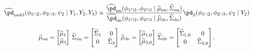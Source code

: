 \begin{equation}
\begin{gathered}
  \widehat{\pd}_{\text{meld}} (\phi_{1 \cap 2}, \phi_{2 \cap 3}, \psi_{2} \mid Y_{1}, Y_{2}, Y_{3})
  \propto
  \frac {
    \widehat{\pd}_{\text{nu}}(\phi_{1 \cap 2}, \phi_{2 \cap 3} \mid \widehat{\mu}_{\text{nu}}, \widehat{\Sigma}_{\text{nu}})
  } {
    \widehat{\pd}_{\text{de}}(\phi_{1 \cap 2}, \phi_{2 \cap 3} \mid \widehat{\mu}_{\text{de}}, \widehat{\Sigma}_{\text{de}})
  }
  \pd_{2}(\phi_{1 \cap 2}, \phi_{2 \cap 3}, \psi_{2} \mid Y_{2}) \\[1.5ex]
  \widehat{\mu}_{\text{nu}} = \begin{bmatrix}
    \widehat{\mu}_{1} \\
    \widehat{\mu}_{3}
  \end{bmatrix} \, 
  \widehat{\Sigma}_{\text{nu}} = \begin{bmatrix}
    \widehat{\Sigma}_{1} & 0 \\
    0 & \widehat{\Sigma}_{3}
  \end{bmatrix} \,
  \widehat{\mu}_{\text{de}} = \begin{bmatrix}
    \widehat{\mu}_{1, 0} \\
    \widehat{\mu}_{3, 0}
  \end{bmatrix} \,
  \widehat{\Sigma}_{\text{de}} = \begin{bmatrix}
    \widehat{\Sigma}_{1, 0} & 0 \\
    0 & \widehat{\Sigma}_{3, 0}
  \end{bmatrix}.
\end{gathered}
\label{eqn:normal-approx-nu-de-form}
\end{equation}
  